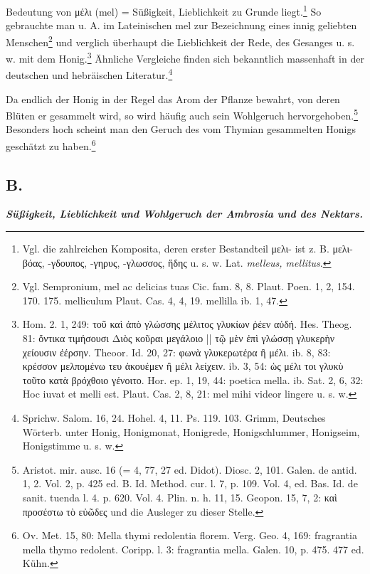 \documentclass[a4paper, 11pt, oneside]{article}
\begin{document}
Bedeutung von μέλι (mel) = Süßigkeit, Lieblichkeit zu Grunde liegt.\footnote{Vgl. die zahlreichen Komposita, deren erster Bestandteil μελι- ist z. B. μελι-βόας, -γδουπος, -γηρυς, -γλωσσος, ἥδης u. s. w. Lat. \emph{melleus, mellitus}.} So gebrauchte man u. A. im Lateinischen mel zur Bezeichnung eines innig geliebten Menschen\footnote{Vgl. Sempronium, mel ac delicias tuas Cic. fam. 8, 8. Plaut. Poen. 1, 2, 154. 170. 175. melliculum Plaut. Cas. 4, 4, 19. mellilla ib. 1, 47.} und verglich überhaupt die Lieblichkeit der Rede, des Gesanges u. s. w. mit dem Honig.\footnote{Hom. 2. 1, 249: τοῦ καὶ ἀπὸ γλώσσης μέλιτος γλυκίων ῥέεν αὐδή. Hes. Theog. 81: ὄντικα τιμήσουσι Διὸς κοῦραι μεγάλοιο || τῷ μὲν ἐπὶ γλώσσῃ γλυκερὴν χείουσιν ἐέρσην. Theoor. Id. 20, 27: φωνὰ γλυκερωτέρα ἢ μέλι. ib. 8, 83: κρέσσον μελπομένω τευ ἀκουέμεν ἢ μέλι λείχειν. ib. 3, 54: ὡς μέλι τοι γλυκὺ τοῦτο κατὰ βρόχθοιο γένοιτο. Hor. ep. 1, 19, 44: poetica mella. ib. Sat. 2, 6, 32: Hoc iuvat et melli est. Plaut. Cas. 2, 8, 21: mel mihi videor lingere u. s. w.} Ähnliche Vergleiche finden sich bekanntlich massenhaft in der deutschen und hebräischen Literatur.\footnote{Sprichw. Salom. 16, 24. Hohel. 4, 11. Ps. 119. 103. Grimm, Deutsches Wörterb. unter Honig, Honigmonat, Honigrede, Honigschlummer, Honigseim, Honigstimme u. s. w.}

Da endlich der Honig in der Regel das Arom der Pflanze bewahrt, von deren Blüten er gesammelt wird, so wird häufig auch sein Wohlgeruch hervorgehoben.\footnote{Aristot. mir. ausc. 16 (= 4, 77, 27 ed. Didot). Diosc. 2, 101. Galen. de antid. 1, 2. Vol. 2, p. 425 ed. B. Id. Method. cur. l. 7, p. 109. Vol. 4, ed. Bas. Id. de sanit. tuenda l. 4. p. 620. Vol. 4. Plin. n. h. 11, 15. Geopon. 15, 7, 2: καὶ προσέστω τὸ εὐῶδες und die Ausleger zu dieser Stelle.} Besonders hoch scheint man den Geruch des vom Thymian gesammelten Honigs geschätzt zu haben.\footnote{Ov. Met. 15, 80: Mella thymi redolentia florem. Verg. Geo. 4, 169: fragrantia mella thymo redolent. Coripp. l. 3: fragrantia mella. Galen. 10, p. 475. 477 ed. Kühn.}

\subsection{B.}
\begin{center}
\textbf{\emph{Süßigkeit, Lieblichkeit und Wohlgeruch der Ambrosia und des Nektars.}}
\end{center}
\end{document}
